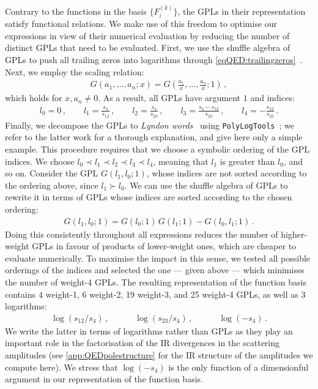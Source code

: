 \documentclass[main.tex]{subfiles}
\begin{document}
Contrary to the functions in the basis $\{F^{(k)}_i\}$, the GPLs in their representation satisfy functional relations. We make use of this freedom to optimise our expressions in view of their numerical evaluation by reducing the number of distinct GPLs that need to be evaluated. First, we use the shuffle algebra of GPLs to push all trailing zeros into logarithms through \cref{eqQED:trailingzeros}~\cite{Vollinga:2004sn}. Next, we employ the scaling relation:
\begin{align}
G(a_1, \ldots, a_n; x) = G\left(\frac{a_1}{x}, \ldots, \frac{a_n}{x}; 1\right) \,,
\end{align}
which holds for $x, a_n \neq 0$. As a result, all GPLs have argument $1$ and indices:
\begin{align} \label{eqQED:indices}
l_0 = 0 \,, \qquad 
l_1 = \frac{s_4}{s_{12}} \,, \qquad 
l_2 = \frac{s_4}{s_{23}} \,, \qquad
l_3 = \frac{s_4-s_{12}}{s_{23}} \,, \qquad
l_4 = - \frac{s_{12}}{s_{23}}\,.
\end{align}
%
Finally, we decompose the GPLs to \emph{Lyndon words}~\cite{Radford1979ANR} using \texttt{PolyLogTools}~\cite{Duhr:2019tlz}; we refer to the latter work for a thorough explanation, and give here only a simple example. 
This procedure requires that we choose a symbolic ordering of the GPL indices. We choose $l_0 \prec l_1 \prec l_2 \prec l_3 \prec l_4$, meaning that $l_1$ is greater than $l_0$, and so on. 
Consider the GPL $G(l_1, l_0; 1)$, whose indices are not sorted according to the ordering above, since $l_1 \succ l_0$. We can use the shuffle algebra of GPLs to rewrite it in terms of GPLs whose indices are sorted according to the chosen ordering:
\begin{align}
G(l_1, l_0; 1) = G(l_0;1) \, G(l_1;1) - G(l_0, l_1; 1) \,.
\end{align}
Doing this consistently throughout all expressions reduces the number of higher-weight GPLs in favour of products of lower-weight ones, which are cheaper to evaluate numerically. To maximise the impact in this sense, we tested all possible orderings of the indices and selected the one --- given above --- which minimises the number of weight-4 GPLs.
The resulting representation of the function basis contains $4$ weight-1, 6 weight-2, 19 weight-3, and 25 weight-4 GPLs, as well as $3$ logarithms: 
\begin{align} \label{eqQED:logs}
\log(s_{12}/s_4) \,, \qquad \quad \log(s_{23}/s_4) \,, \qquad \quad \log(-s_4) \,.
\end{align}
We write the latter in terms of logarithms rather than GPLs as they play an important role in the factorisation of the IR divergences in the scattering amplitudes (see \cref{app:QEDpolestructure} for the IR structure of the amplitudes we compute here). We stress that $\log(-s_4)$ is the only function of a dimensionful argument in our representation of the function basis. 
\end{document}
